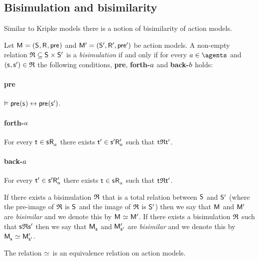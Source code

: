 \subsection{Bisimulation and bisimilarity}

Similar to Kripke models there is a notion of bisimilarity of action models.

\begin{definition}
Let $\aModelAndTuple$ and $\aModelAndTupleP$ be action models.
A non-empty relation $\bisimulation \subseteq \aStates \times \aStatesP$ is a {\em bisimulation} if and only if for every $\agentA \in \agents$ and $(\aStateS, \aStateSP) \in \bisimulation$ the following conditions, {\bf pre}, {\bf forth-$a$} and {\bf back-$b$} holds:

\paragraph{pre}
$\entails \aPrecondition(\aStateS) \iff \aPrecondition(\aStateSP)$.

\paragraph{forth-$a$}
For every $\aStateT \in \aSuccessorsA{\aStateS}$ there exists ${\mathsf{{t}}^{\prime}} \in {{\mathsf{{s}}^{\prime}}} {\mathsf{R}^{\prime}_{a}}$ such that $\aStateT \bisimulation \aStateTP$.

\paragraph{back-$a$}
For every ${\mathsf{{t}}^{\prime}} \in {{\mathsf{{s}}^{\prime}}} {\mathsf{R}^{\prime}_{a}}$ there exists $\aStateT \in \aSuccessorsA{\aStateS}$ such that $\aStateT \bisimulation \aStateTP$.

If there exists a bisimulation $\mathfrak{R}$ that is a total relation between $\aStates$ and ${\mathsf{S}^{\prime}}$ (where the pre-image of $\mathfrak{R}$ is $\aStates$ and the image of $\mathfrak{R}$ is ${\mathsf{S}^{\prime}}$) then we say that $\aModel$ and ${\mathsf{M}^{\prime}}$ are {\em bisimilar} and we denote this by $\aModel \bisimilar \aModelP$.
If there exists a bisimulation $\mathfrak{R}$ such that $\aStateS \bisimulation \aStateSP$ then we say that $\aPModel{\aStateS}$ and ${\mathsf{M}^{\prime}_{{\mathsf{{s}}^{\prime}}}}$ are {\em bisimilar} and we denote this by $\aPModel{\aStateS} \bisimilar \aPModelP{\aStateSP}$.
\end{definition}

\begin{proposition}
The relation $\bisimilar$ is an equivalence relation on action models.
\end{proposition}


